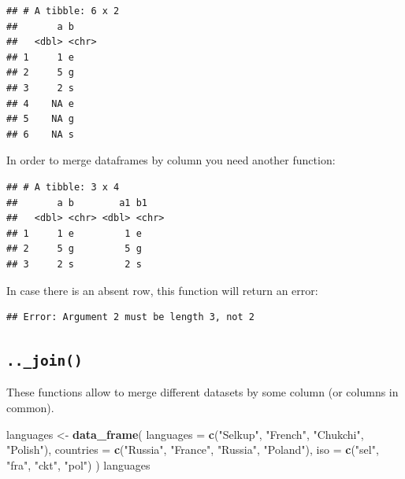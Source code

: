 \documentclass[
]{book}
\newenvironment{Shaded}{\begin{snugshade}}{\end{snugshade}}
\newcommand{\DataTypeTok}[1]{\textcolor[rgb]{0.13,0.29,0.53}{#1}}
\newcommand{\DecValTok}[1]{\textcolor[rgb]{0.00,0.00,0.81}{#1}}
\newcommand{\KeywordTok}[1]{\textcolor[rgb]{0.13,0.29,0.53}{\textbf{#1}}}
\newcommand{\NormalTok}[1]{#1}
\newcommand{\OperatorTok}[1]{\textcolor[rgb]{0.81,0.36,0.00}{\textbf{#1}}}
\newcommand{\StringTok}[1]{\textcolor[rgb]{0.31,0.60,0.02}{#1}}
\begin{document}
\begin{verbatim}
## # A tibble: 6 x 2
##       a b    
##   <dbl> <chr>
## 1     1 e    
## 2     5 g    
## 3     2 s    
## 4    NA e    
## 5    NA g    
## 6    NA s
\end{verbatim}

In order to merge dataframes by column you need another function:

\begin{Shaded}
\end{Shaded}

\begin{verbatim}
## # A tibble: 3 x 4
##       a b        a1 b1   
##   <dbl> <chr> <dbl> <chr>
## 1     1 e         1 e    
## 2     5 g         5 g    
## 3     2 s         2 s
\end{verbatim}

In case there is an absent row, this function will return an error:

\begin{Shaded}
\end{Shaded}

\begin{verbatim}
## Error: Argument 2 must be length 3, not 2
\end{verbatim}

\hypertarget{join}{%
\subsection{\texorpdfstring{\texttt{..\_join()}}{..\_join()}}\label{join}}

These functions allow to merge different datasets by some column (or columns in common).

\begin{Shaded}
\begin{Highlighting}[]
\NormalTok{languages <-}\StringTok{ }\KeywordTok{data_frame}\NormalTok{(}
  \DataTypeTok{languages =} \KeywordTok{c}\NormalTok{(}\StringTok{"Selkup"}\NormalTok{, }\StringTok{"French"}\NormalTok{, }\StringTok{"Chukchi"}\NormalTok{, }\StringTok{"Polish"}\NormalTok{),}
  \DataTypeTok{countries =} \KeywordTok{c}\NormalTok{(}\StringTok{"Russia"}\NormalTok{, }\StringTok{"France"}\NormalTok{, }\StringTok{"Russia"}\NormalTok{, }\StringTok{"Poland"}\NormalTok{),}
  \DataTypeTok{iso =} \KeywordTok{c}\NormalTok{(}\StringTok{"sel"}\NormalTok{, }\StringTok{"fra"}\NormalTok{, }\StringTok{"ckt"}\NormalTok{, }\StringTok{"pol"}\NormalTok{)}
\NormalTok{  )}
\NormalTok{languages}
\end{Highlighting}
\end{Shaded}
\end{document}

